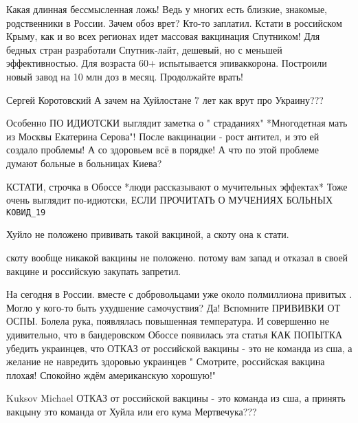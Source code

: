 \begin{itemize}


Какая длинная бессмысленная ложь! Ведь у многих есть близкие, знакомые,
родственники в России. Зачем обоз врет? Кто-то заплатил.  Кстати в российском
Крыму, как и во всех регионах идет массовая вакцинация Спутником! Для бедных
стран разработали Спутник-лайт, дешевый, но с меньшей эффективностью. Для
возраста 60+ испытывается эпиваккорона. Построили новый завод на 10 млн доз в
месяц. Продолжайте врать!


Сергей Коротовский А зачем на Хуйлостане 7 лет как врут про Украину???


Особенно ПО ИДИОТСКИ выглядит заметка о " страданиях" *Многодетная мать из
Москвы Екатерина Серова"! После вакцинации - рост антител, и это ей создало
проблемы! А со здоровьем всё в порядке! А что по этой проблеме думают больные в
больницах Киева?


КСТАТИ, строчка в Обоссе *люди рассказывают о мучительных эффектах* Тоже очень
выглядит по-идиотски, ЕСЛИ ПРОЧИТАТЬ О МУЧЕНИЯХ БОЛЬНЫХ \verb|КОВИД_19|


Хуйло не положено прививать такой вакциной, а скоту она к стати.


скоту вообще никакой вакцины не положено. потому вам запад и отказал в своей вакцине и российскую закупать запретил.


На сегодня в России. вместе с добровольцами уже около полмиллиона привитых .
Могло у кого-то быть ухудшение самочуствия? Да! Вспомните ПРИВИВКИ ОТ ОСПЫ.
Болела рука, появлялась повышенная температура. И совершенно не удивительно,
что в бандеровском Обоссе появилась эта статья КАК ПОПЫТКА убедить украинцев,
что ОТКАЗ от российской вакцины - это не команда из сша, а желание не навредить
здоровью украинцев " Смотрите, российская вакцина плохая! Спокойно ждём
американскую хорошую!"


Kuksov Michael ОТКАЗ от российской вакцины - это команда из сша, а принять
вакцыну это команда от Хуйла или его кума Мертвечука???


\end{itemize}
